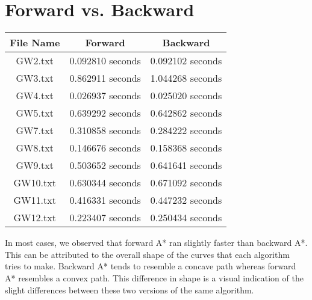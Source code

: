\documentclass{article}
\begin{document}
\section{Forward vs. Backward}
\begin{center}
 \begin{tabular}{||c c c||} 
 \hline
 File Name & Forward & Backward \\ [0.5ex] 
 \hline\hline
 GW2.txt & 0.092810 seconds & 0.092102 seconds\\ 
 \hline
 GW3.txt & 0.862911 seconds & 1.044268 seconds\\
 \hline
 GW4.txt & 0.026937 seconds & 0.025020 seconds\\
 \hline
 GW5.txt & 0.639292 seconds & 0.642862 seconds\\
 \hline
 GW7.txt & 0.310858 seconds & 0.284222 seconds\\
 \hline
 GW8.txt & 0.146676 seconds & 0.158368 seconds\\
 \hline
 GW9.txt & 0.503652 seconds & 0.641641 seconds\\
 \hline
 GW10.txt & 0.630344 seconds & 0.671092 seconds\\
 \hline
 GW11.txt & 0.416331 seconds & 0.447232 seconds\\
 \hline
 GW12.txt & 0.223407 seconds & 0.250434 seconds\\
 \hline
\end{tabular}
\end{center}

In most cases, we observed that forward A* ran slightly faster than backward A*. This can be attributed to the overall shape of the curves that each algorithm tries to make. Backward A* tends to resemble a concave path whereas forward A* resembles a convex path. This difference in shape is a visual indication of the slight differences between these two versions of the same algorithm.
\end{document}
